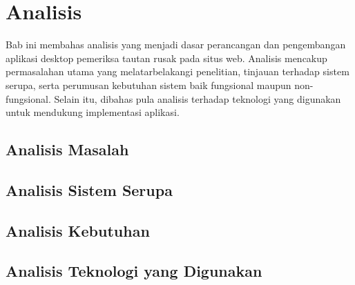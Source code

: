 \chapter{Analisis}
\label{chap:analisis}

Bab ini membahas analisis yang menjadi dasar perancangan dan pengembangan aplikasi desktop pemeriksa tautan rusak pada situs web. Analisis mencakup permasalahan utama yang melatarbelakangi penelitian, tinjauan terhadap sistem serupa, serta perumusan kebutuhan sistem baik fungsional maupun non-fungsional. Selain itu, dibahas pula analisis terhadap teknologi yang digunakan untuk mendukung implementasi aplikasi.

\section{Analisis Masalah}
\label{sec:03-analisis-masalah}



\section{Analisis Sistem Serupa}
\label{sec:03-analisis-sistem-serupa}



\section{Analisis Kebutuhan}
\label{sec:03-analisis-kebutuhan}



\section{Analisis Teknologi yang Digunakan}
\label{sec:03-analisis-teknologi-yang-digunakan}


